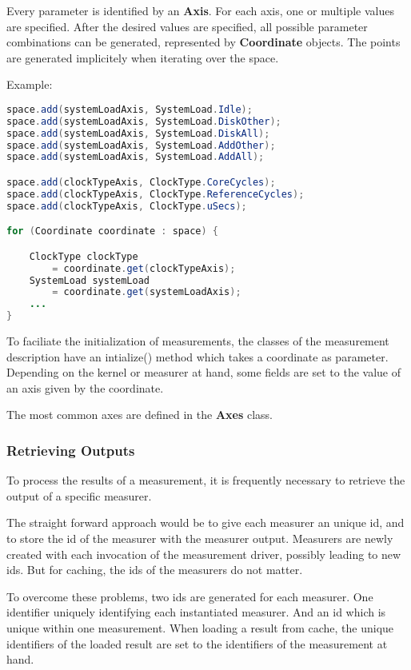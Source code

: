 \documentclass[a4paper,12pt]{article}
\newcommand{\class}[1]{\textbf{#1}}
\newcommand{\method}[1]{\textsf{#1}}
\begin{document}
Every parameter is identified by an \class{Axis}. For
each axis, one or multiple values are specified. After the desired values are
specified, all possible parameter combinations can be generated, represented by
\class{Coordinate} objects. The points are generated implicitely when iterating
over the space.

Example:
\begin{lstlisting}[language=Java]
space.add(systemLoadAxis, SystemLoad.Idle);
space.add(systemLoadAxis, SystemLoad.DiskOther);
space.add(systemLoadAxis, SystemLoad.DiskAll);
space.add(systemLoadAxis, SystemLoad.AddOther);
space.add(systemLoadAxis, SystemLoad.AddAll);

space.add(clockTypeAxis, ClockType.CoreCycles);
space.add(clockTypeAxis, ClockType.ReferenceCycles);
space.add(clockTypeAxis, ClockType.uSecs);

for (Coordinate coordinate : space) {

	ClockType clockType 
		= coordinate.get(clockTypeAxis);
	SystemLoad systemLoad 
		= coordinate.get(systemLoadAxis);
	...
}			
\end{lstlisting}

To faciliate the initialization of measurements, the classes of the measurement
description have an \method{intialize()} method which takes a coordinate as
parameter. Depending on the kernel or measurer at hand, some fields are
set to the value of an axis given by the coordinate.

The most common axes are defined in the \class{Axes} class.

\subsubsection{Retrieving Outputs}
To process the results of a measurement, it is frequently necessary to
retrieve the output of a specific measurer. 

The straight forward approach would be to give each measurer an unique id, and
to store the id of the measurer with the measurer output. Measurers are newly
created with each invocation of the measurement driver, possibly leading to new
ids. But for caching, the ids of the measurers do not matter.

To overcome these problems, two ids are generated for each measurer. One
identifier uniquely identifying each instantiated measurer. And an id which is
unique within one measurement. When loading a result from cache, the unique
identifiers of the loaded result are set to the identifiers of the measurement
at hand.
\end{document}
